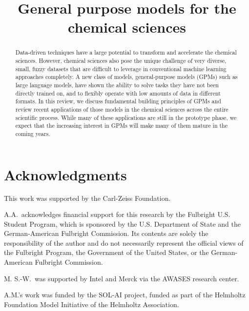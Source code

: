\documentclass[11pt, oneside]{article}
\title{\textsf{General purpose models for the chemical sciences}}
\begin{document}
\maketitle

\begin{abstract}
    \noindent Data-driven techniques have a large potential to transform and accelerate the chemical sciences. 
    However, chemical sciences also pose the unique challenge of very diverse, small, fuzzy datasets that are difficult to leverage in conventional machine learning approaches completely. 
    A new class of models, general-purpose models (GPMs) such as large language models, have shown the ability to solve tasks they have not been directly trained on, and to flexibly operate with low amounts of data in different formats.
    In this review, we discuss fundamental building principles of GPMs and review recent applications of those models in the chemical sciences across the entire scientific process.
    While many of these applications are still in the prototype phase, we expect that the increasing interest in GPMs will make many of them mature in the coming years. 
\end{abstract}
\pagebreak
\tableofcontents

\clearpage 

  






\section*{Acknowledgments}

This work was supported by the Carl-Zeiss Foundation. 

\noindent A.A.\ acknowledges financial support for this research by the Fulbright U.S. Student Program, which is sponsored by the U.S. Department of State and the German-American Fulbright Commission. Its contents are solely the responsibility of the author and do not necessarily represent the official views of the Fulbright Program, the Government of the United States, or the German-American Fulbright Commission. 
 
\noindent M. S.-W.\ was supported by Intel and Merck via the AWASES research center. 

\noindent A.M.'s work was funded by the SOL-AI project, funded as part of the Helmholtz Foundation Model Initiative of the Helmholtz Association. 
\end{document}
